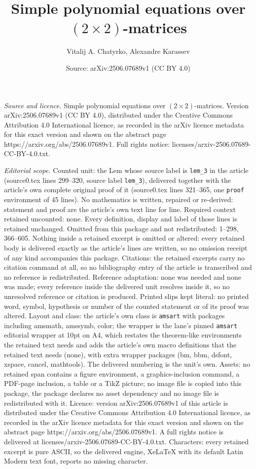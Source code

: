 \documentclass[10pt,a4paper]{amsart}
\title[Simple polynomial equations over $(2 \times 2)$-matrices]{Simple polynomial equations over $(2 \times 2)$-matrices}
\author{Vitalij A. Chatyrko, Alexandre Karassev}
\date{Source: arXiv:2506.07689v1 (CC BY 4.0)}
\begin{document}
\maketitle

\noindent\emph{Source and licence.} Simple polynomial equations over $(2 \times 2)$-matrices. Version arXiv:2506.07689v1 (CC BY 4.0), distributed under the Creative Commons Attribution 4.0 International licence, as recorded in the arXiv licence metadata for this exact version and shown on the abstract page https://arxiv.org/abs/2506.07689v1. Full rights notice: licenses/arxiv-2506.07689-CC-BY-4.0.txt.\par\smallskip

\noindent\textit{Editorial scope.} Counted unit: the Lem whose source label is \texttt{lem\_3} in the article (source0.tex lines 299--320, source label \texttt{lem\_3}), delivered together with the article's own complete original proof of it (source0.tex lines 321--365, one \texttt{proof} environment of 45 lines). No mathematics is written, repaired or re-derived: statement and proof are the article's own text line for line. Required context retained uncounted: none. Every definition, display and label of those lines is retained unchanged. Omitted from this package and not redistributed: 1--298, 366--605. Nothing inside a retained excerpt is omitted or altered: every retained body is delivered exactly as the article's lines are written, so no omission receipt of any kind accompanies this package. Citations: the retained excerpts carry no citation command at all, so no bibliography entry of the article is transcribed and no reference is redistributed. Reference adaptation: none was needed and none was made; every reference inside the delivered unit resolves inside it, so no unresolved reference or citation is produced. Printed slips kept literal: no printed word, symbol, hypothesis or number of the counted statement or of its proof was altered. Layout and class: the article's own class is \texttt{amsart} with packages including amsmath, amssymb, color; the wrapper is the lane's pinned \texttt{amsart} editorial wrapper at 10pt on A4, which restates the theorem-like environments the retained text needs and adds the article's own macro definitions that the retained text needs (none), with extra wrapper packages (bm, bbm, dsfont, xspace, cancel, mathtools). The delivered numbering is the unit's own. Assets: no retained span contains a figure environment, a graphics-inclusion command, a PDF-page inclusion, a table or a TikZ picture; no image file is copied into this package, the package declares no asset dependency and no image file is redistributed with it. Licence: version arXiv:2506.07689v1 of this article is distributed under the Creative Commons Attribution 4.0 International licence, as recorded in the arXiv licence metadata for this exact version and shown on the abstract page https://arxiv.org/abs/2506.07689v1. A full rights notice is delivered at licenses/arxiv-2506.07689-CC-BY-4.0.txt. Characters: every retained excerpt is pure ASCII, so the delivered engine, XeLaTeX with its default Latin Modern text font, reports no missing character.
\end{document}
